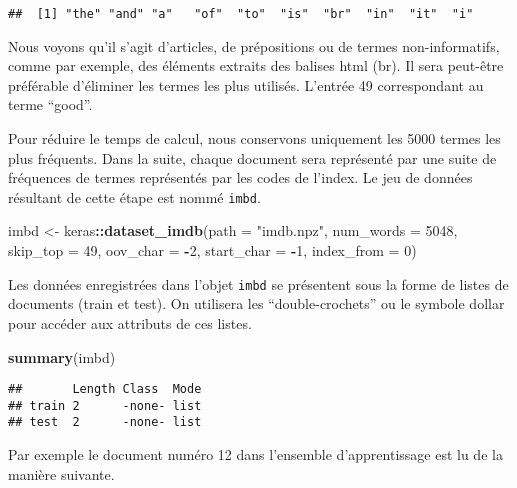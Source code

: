 \documentclass[]{article}
\newenvironment{Shaded}{\begin{snugshade}}{\end{snugshade}}
\newcommand{\KeywordTok}[1]{\textcolor[rgb]{0.13,0.29,0.53}{\textbf{#1}}}
\newcommand{\DataTypeTok}[1]{\textcolor[rgb]{0.13,0.29,0.53}{#1}}
\newcommand{\DecValTok}[1]{\textcolor[rgb]{0.00,0.00,0.81}{#1}}
\newcommand{\StringTok}[1]{\textcolor[rgb]{0.31,0.60,0.02}{#1}}
\newcommand{\OperatorTok}[1]{\textcolor[rgb]{0.81,0.36,0.00}{\textbf{#1}}}
\newcommand{\NormalTok}[1]{#1}
\begin{document}
\begin{verbatim}
##  [1] "the" "and" "a"   "of"  "to"  "is"  "br"  "in"  "it"  "i"
\end{verbatim}

Nous voyons qu'il s'agit d'articles, de prépositions ou de termes
non-informatifs, comme par exemple, des éléments extraits des balises
html (br). Il sera peut-être préférable d'éliminer les termes les plus
utilisés. L'entrée 49 correspondant au terme ``good''.

Pour réduire le temps de calcul, nous conservons uniquement les 5000
termes les plus fréquents. Dans la suite, chaque document sera
représenté par une suite de fréquences de termes représentés par les
codes de l'index. Le jeu de données résultant de cette étape est nommé
\texttt{imbd}.

\begin{Shaded}
\begin{Highlighting}[]
\NormalTok{  imbd <-}\StringTok{  }\NormalTok{keras}\OperatorTok{::}\KeywordTok{dataset_imdb}\NormalTok{(}\DataTypeTok{path =} \StringTok{"imdb.npz"}\NormalTok{,}
                              \DataTypeTok{num_words =} \DecValTok{5048}\NormalTok{,}
                              \DataTypeTok{skip_top =} \DecValTok{49}\NormalTok{,}
                              \DataTypeTok{oov_char =} \OperatorTok{-}\DecValTok{2}\NormalTok{,}
                              \DataTypeTok{start_char =} \OperatorTok{-}\DecValTok{1}\NormalTok{,}
                              \DataTypeTok{index_from =} \DecValTok{0}\NormalTok{)}
\end{Highlighting}
\end{Shaded}

Les données enregistrées dans l'objet \texttt{imbd} se présentent sous
la forme de listes de documents (train et test). On utilisera les
``double-crochets'' ou le symbole dollar pour accéder aux attributs de
ces listes.

\begin{Shaded}
\begin{Highlighting}[]
  \KeywordTok{summary}\NormalTok{(imbd)}
\end{Highlighting}
\end{Shaded}

\begin{verbatim}
##       Length Class  Mode
## train 2      -none- list
## test  2      -none- list
\end{verbatim}

Par exemple le document numéro 12 dans l'ensemble d'apprentissage est lu
de la manière suivante.
\end{document}
